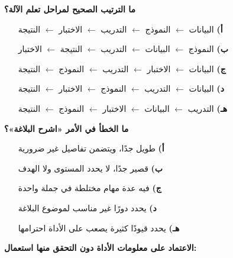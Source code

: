 \documentclass[11pt,a4paper]{article}
\begin{document}
\begin{multicols}{2}
\noindent\begin{minipage}{\linewidth}
\hangindent=0.7cm\textbf{ما الترتيب الصحيح لمراحل تعلم الآلة؟}
\begin{itemize}[leftmargin=0.95cm, labelsep=4pt, itemsep=0pt, topsep=2pt, parsep=0pt]
  \item[\textbf{أ)}] البيانات $\leftarrow$ النموذج $\leftarrow$ التدريب $\leftarrow$ الاختبار $\leftarrow$ النتيجة
  \item[\textbf{ب)}] النموذج $\leftarrow$ البيانات $\leftarrow$ التدريب $\leftarrow$ النتيجة $\leftarrow$ الاختبار
  \item[\textbf{ج)}] البيانات $\leftarrow$ الاختبار $\leftarrow$ التدريب $\leftarrow$ النموذج $\leftarrow$ النتيجة
  \item[\textbf{د)}] البيانات $\leftarrow$ التدريب $\leftarrow$ النموذج $\leftarrow$ الاختبار $\leftarrow$ النتيجة
  \item[\textbf{هـ)}] التدريب $\leftarrow$ البيانات $\leftarrow$ الاختبار $\leftarrow$ النموذج $\leftarrow$ النتيجة
\end{itemize}
\end{minipage}\par\vspace{7pt plus 4pt}
\noindent\begin{minipage}{\linewidth}
\hangindent=0.7cm\textbf{ما الخطأ في الأمر «اشرح البلاغة»؟}
\begin{itemize}[leftmargin=0.95cm, labelsep=4pt, itemsep=0pt, topsep=2pt, parsep=0pt]
  \item[\textbf{أ)}] طويل جدًا، ويتضمن تفاصيل غير ضرورية
  \item[\textbf{ب)}] قصير جدًا، لا يحدد المستوى ولا الهدف
  \item[\textbf{ج)}] فيه عدة مهام مختلطة في جملة واحدة
  \item[\textbf{د)}] يحدد دورًا غير مناسب لموضوع البلاغة
  \item[\textbf{هـ)}] يحدد قيودًا كثيرة يصعب على الأداة احترامها
\end{itemize}
\end{minipage}\par\vspace{7pt plus 4pt}
\noindent\begin{minipage}{\linewidth}
\hangindent=0.7cm\textbf{الاعتماد على معلومات الأداة دون التحقق منها استعمال:}
\begin{itemize}[leftmargin=0.95cm, labelsep=4pt, itemsep=0pt, topsep=2pt, parsep=0pt]

\end{itemize}
\end{minipage}
\end{multicols}
\end{document}
